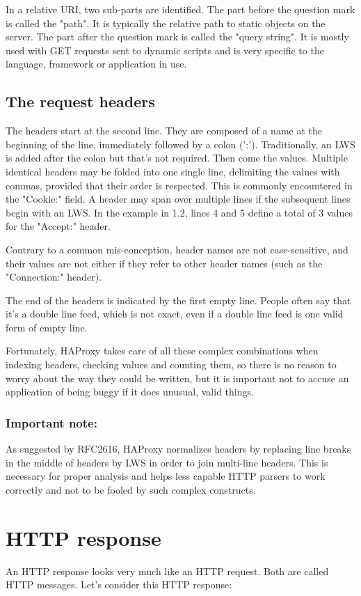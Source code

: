 In a relative URI, two sub-parts are identified. The part before the question
mark is called the "path". It is typically the relative path to static objects
on the server. The part after the question mark is called the "query string".
It is mostly used with GET requests sent to dynamic scripts and is very
specific to the language, framework or application in use.

\subsection{The request headers}
The headers start at the second line. They are composed of a name at the
beginning of the line, immediately followed by a colon (':'). Traditionally,
an LWS is added after the colon but that's not required. Then come the values.
Multiple identical headers may be folded into one single line, delimiting the
values with commas, provided that their order is respected. This is commonly
encountered in the "Cookie:" field. A header may span over multiple lines if
the subsequent lines begin with an LWS. In the example in 1.2, lines 4 and 5
define a total of 3 values for the "Accept:" header.

Contrary to a common mis-conception, header names are not case-sensitive, and
their values are not either if they refer to other header names (such as the
"Connection:" header).

The end of the headers is indicated by the first empty line. People often say
that it's a double line feed, which is not exact, even if a double line feed
is one valid form of empty line.

Fortunately, HAProxy takes care of all these complex combinations when indexing
headers, checking values and counting them, so there is no reason to worry
about the way they could be written, but it is important not to accuse an
application of being buggy if it does unusual, valid things.

\subsubsection*{Important note:}
   As suggested by RFC2616, HAProxy normalizes headers by replacing line breaks
   in the middle of headers by LWS in order to join multi-line headers. This
   is necessary for proper analysis and helps less capable HTTP parsers to work
   correctly and not to be fooled by such complex constructs.


\section{HTTP response}
An HTTP response looks very much like an HTTP request. Both are called HTTP
messages. Let's consider this HTTP response:

